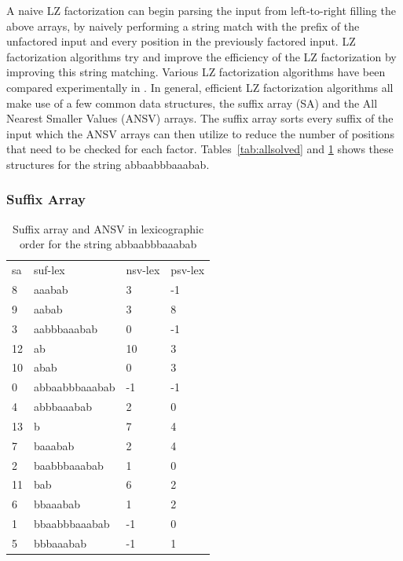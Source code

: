 A naive LZ factorization can begin parsing the input from left-to-right filling the above arrays, by naively performing a string match with the prefix of the unfactored input and every position in the previously factored input.
LZ factorization algorithms try and improve the efficiency of the LZ factorization by improving this string matching.
Various LZ factorization algorithms have been compared experimentally in \cite{al2012comparison}.
In general, efficient LZ factorization algorithms all make use of a few common data structures, the suffix array (SA) and the All Nearest Smaller Values (ANSV) arrays.
The suffix array sorts every suffix of the input which the ANSV arrays can then utilize to reduce the number of positions that need to be checked for each factor.
Tables~\ref{tab:allsolved} and \ref{tab:sa} shows these structures for the string abbaabbbaaabab.

\subsubsection{Suffix Array}
\label{sec:sa}

\begin{table}[ht!]
\centering
\begin{tabular}{llll}
sa & suf-lex        & nsv-lex & psv-lex \\
8  & aaabab         & 3       & -1      \\
9  & aabab          & 3       & 8       \\
3  & aabbbaaabab    & 0       & -1      \\
12 & ab             & 10      & 3       \\
10 & abab           & 0       & 3       \\
0  & abbaabbbaaabab & -1      & -1      \\
4  & abbbaaabab     & 2       & 0       \\
13 & b              & 7       & 4       \\
7  & baaabab        & 2       & 4       \\
2  & baabbbaaabab   & 1       & 0       \\
11 & bab            & 6       & 2       \\
6  & bbaaabab       & 1       & 2       \\
1  & bbaabbbaaabab  & -1      & 0       \\
5  & bbbaaabab      & -1      & 1      
\end{tabular}
\caption{Suffix array and ANSV in lexicographic order for the string abbaabbbaaabab}
\label{tab:sa}
\end{table}

